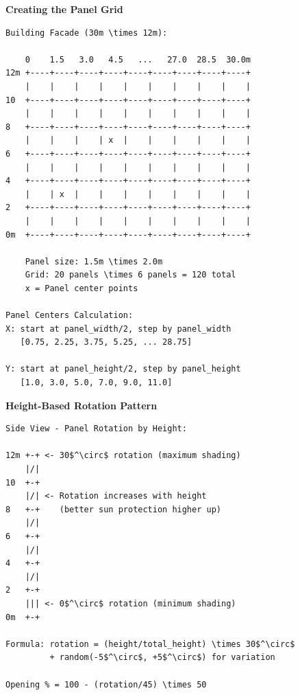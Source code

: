 \begin{tcolorbox}[
    title=Facade Grid Generation (Visual),
    colframe=brown,
    colback = white,
    arc=2mm
]
\textbf{Creating the Panel Grid}
\begin{lstlisting}[basicstyle=\ttfamily\footnotesize,breaklines=true,columns=fullflexible,keepspaces=true,xleftmargin=0pt]
Building Facade (30m \times 12m):
    
    0    1.5   3.0   4.5   ...   27.0  28.5  30.0m
12m +----+----+----+----+----+----+----+----+----+
    |    |    |    |    |    |    |    |    |    |
10  +----+----+----+----+----+----+----+----+----+
    |    |    |    |    |    |    |    |    |    |
8   +----+----+----+----+----+----+----+----+----+
    |    |    |    | x  |    |    |    |    |    |
6   +----+----+----+----+----+----+----+----+----+
    |    |    |    |    |    |    |    |    |    |
4   +----+----+----+----+----+----+----+----+----+
    |    | x  |    |    |    |    |    |    |    |
2   +----+----+----+----+----+----+----+----+----+
    |    |    |    |    |    |    |    |    |    |
0m  +----+----+----+----+----+----+----+----+----+
    
    Panel size: 1.5m \times 2.0m
    Grid: 20 panels \times 6 panels = 120 total
    x = Panel center points

Panel Centers Calculation:
X: start at panel_width/2, step by panel_width
   [0.75, 2.25, 3.75, 5.25, ... 28.75]
   
Y: start at panel_height/2, step by panel_height
   [1.0, 3.0, 5.0, 7.0, 9.0, 11.0]

\end{lstlisting}

\textbf{Height-Based Rotation Pattern}
\begin{lstlisting}[basicstyle=\ttfamily\footnotesize,breaklines=true,columns=fullflexible,keepspaces=true,xleftmargin=0pt]
Side View - Panel Rotation by Height:

12m +-+ <- 30$^\circ$ rotation (maximum shading)
    |/|
10  +-+
    |/| <- Rotation increases with height
8   +-+    (better sun protection higher up)
    |/|
6   +-+
    |/|
4   +-+
    |/|
2   +-+
    ||| <- 0$^\circ$ rotation (minimum shading)
0m  +-+
    
Formula: rotation = (height/total_height) \times 30$^\circ$
         + random(-5$^\circ$, +5$^\circ$) for variation

Opening % = 100 - (rotation/45) \times 50

\end{lstlisting}
\end{tcolorbox}

